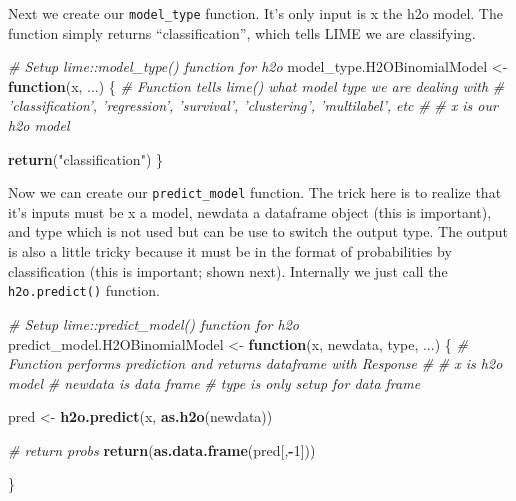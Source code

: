 \documentclass[]{book}
\newenvironment{Shaded}{\begin{snugshade}}{\end{snugshade}}
\newcommand{\CommentTok}[1]{\textcolor[rgb]{0.56,0.35,0.01}{\textit{#1}}}
\newcommand{\ControlFlowTok}[1]{\textcolor[rgb]{0.13,0.29,0.53}{\textbf{#1}}}
\newcommand{\DecValTok}[1]{\textcolor[rgb]{0.00,0.00,0.81}{#1}}
\newcommand{\KeywordTok}[1]{\textcolor[rgb]{0.13,0.29,0.53}{\textbf{#1}}}
\newcommand{\NormalTok}[1]{#1}
\newcommand{\OperatorTok}[1]{\textcolor[rgb]{0.81,0.36,0.00}{\textbf{#1}}}
\newcommand{\StringTok}[1]{\textcolor[rgb]{0.31,0.60,0.02}{#1}}
\begin{document}
Next we create our \texttt{model\_type} function. It's only input is x the h2o model. The function simply returns ``classification'', which tells LIME we are classifying.\\

\begin{Shaded}
\begin{Highlighting}[]
\CommentTok{# Setup lime::model_type() function for h2o}
\NormalTok{model_type.H2OBinomialModel <-}\StringTok{ }\ControlFlowTok{function}\NormalTok{(x, ...) \{}
    \CommentTok{# Function tells lime() what model type we are dealing with}
    \CommentTok{# 'classification', 'regression', 'survival', 'clustering', 'multilabel', etc}
    \CommentTok{#}
    \CommentTok{# x is our h2o model}
    
    \KeywordTok{return}\NormalTok{(}\StringTok{"classification"}\NormalTok{)}
\NormalTok{\}}
\end{Highlighting}
\end{Shaded}

Now we can create our \texttt{predict\_model} function. The trick here is to realize that it's inputs must be x a model, newdata a dataframe object (this is important), and type which is not used but can be use to switch the output type. The output is also a little tricky because it must be in the format of probabilities by classification (this is important; shown next). Internally we just call the \texttt{h2o.predict()} function.

\begin{Shaded}
\begin{Highlighting}[]
\CommentTok{# Setup lime::predict_model() function for h2o}
\NormalTok{predict_model.H2OBinomialModel <-}\StringTok{ }\ControlFlowTok{function}\NormalTok{(x, newdata, type, ...) \{}
    \CommentTok{# Function performs prediction and returns dataframe with Response}
    \CommentTok{#}
    \CommentTok{# x is h2o model}
    \CommentTok{# newdata is data frame}
    \CommentTok{# type is only setup for data frame}
    
\NormalTok{    pred <-}\StringTok{ }\KeywordTok{h2o.predict}\NormalTok{(x, }\KeywordTok{as.h2o}\NormalTok{(newdata))}
    
    \CommentTok{# return probs}
    \KeywordTok{return}\NormalTok{(}\KeywordTok{as.data.frame}\NormalTok{(pred[,}\OperatorTok{-}\DecValTok{1}\NormalTok{]))}
    
\NormalTok{\}}
\end{Highlighting}
\end{Shaded}
\end{document}

